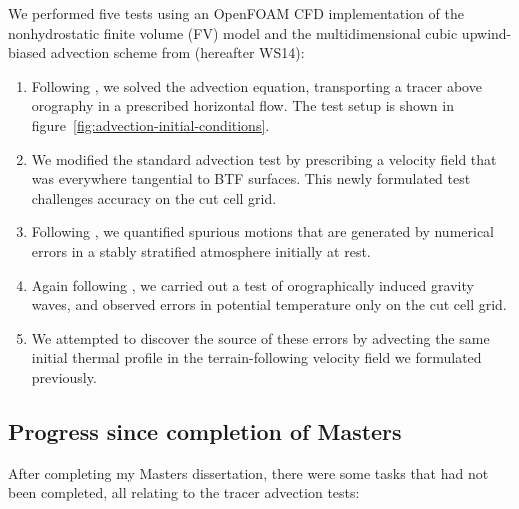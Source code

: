 \documentclass[a4paper]{article}
\begin{document}
We performed five tests using an OpenFOAM CFD implementation of the nonhydrostatic finite volume (FV) model and the multidimensional cubic upwind-biased advection scheme from \citet{weller-shahrokhi2014} (hereafter WS14):
\begin{enumerate}
	\item Following \citet{schaer2002}, we solved the advection equation, transporting a tracer above orography in a prescribed horizontal flow.  The test setup is shown in figure~\ref{fig:advection-initial-conditions}.
	\item We modified the standard advection test by prescribing a velocity field that was everywhere tangential to BTF surfaces.  This newly formulated test challenges accuracy on the cut cell grid.
	\item Following \citet{klemp2011}, we quantified spurious motions that are generated by numerical errors in a stably stratified atmosphere initially at rest.
	\item Again following \citet{schaer2002}, we carried out a test of orographically induced gravity waves, and observed errors in potential temperature only on the cut cell grid.
	\item We attempted to discover the source of these errors by advecting the same initial thermal profile in the terrain-following velocity field we formulated previously.
\end{enumerate}

\subsection{Progress since completion of Masters}
\label{sec:progress}

After completing my Masters dissertation, there were some tasks that had not been completed, all relating to the tracer advection tests:
\end{document}
